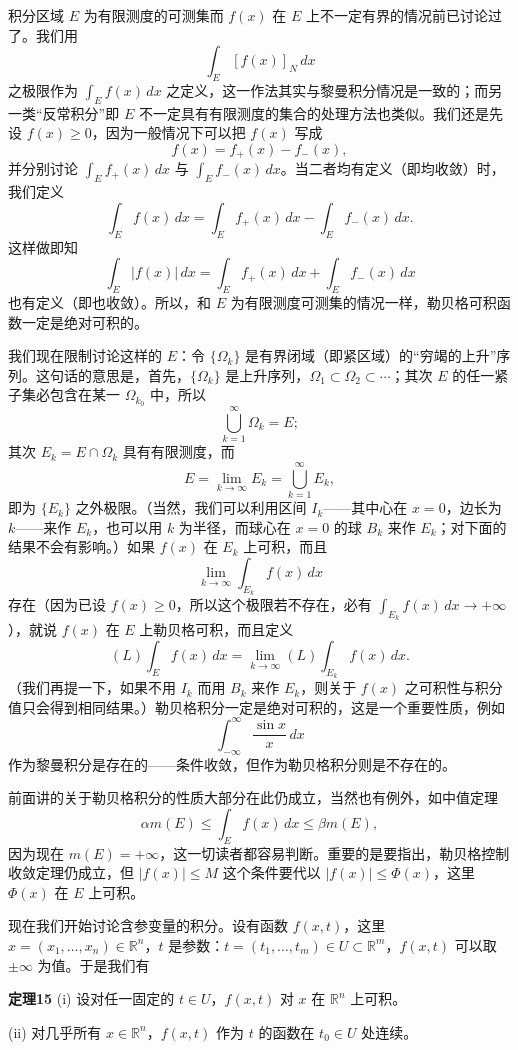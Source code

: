 积分区域 $E$ 为有限测度的可测集而 $f(x)$ 在 $E$ 上不一定有界的情况前已讨论过了。我们用
\[
 \int_E [f(x)]_N\,dx
\]
之极限作为 $\int_E f(x)\,dx$ 之定义，这一作法其实与黎曼积分情况是一致的；而另一类“反常积分”即 $E$ 不一定具有有限测度的集合的处理方法也类似。我们还是先设 $f(x)\ge0$，因为一般情况下可以把 $f(x)$ 写成
\[
 f(x)=f_+(x)-f_-(x),
\]
并分别讨论 $\int_E f_+(x)\,dx$ 与 $\int_E f_-(x)\,dx$。当二者均有定义（即均收敛）时，我们定义
\[
 \int_E f(x)\,dx=\int_E f_+(x)\,dx-\int_E f_-(x)\,dx.
\]
这样做即知
\[
 \int_E |f(x)|\,dx=\int_E f_+(x)\,dx+\int_E f_-(x)\,dx
\]
也有定义（即也收敛）。所以，和 $E$ 为有限测度可测集的情况一样，勒贝格可积函数一定是绝对可积的。

我们现在限制讨论这样的 $E$：令 $\{\Omega_k\}$ 是有界闭域（即紧区域）的“穷竭的上升”序列。这句话的意思是，首先，$\{\Omega_k\}$ 是上升序列，$\Omega_1\subset\Omega_2\subset\cdots$；其次 $E$ 的任一紧子集必包含在某一 $\Omega_{k_0}$ 中，所以
\[
 \bigcup_{k=1}^{\infty}\Omega_k=E;
\]
其次 $E_k=E\cap\Omega_k$ 具有有限测度，而
\[
 E=\lim_{k\to\infty}E_k=\bigcup_{k=1}^{\infty}E_k,
\]
即为 $\{E_k\}$ 之外极限。（当然，我们可以利用区间 $I_k$——其中心在 $x=0$，边长为 $k$——来作 $E_k$，也可以用 $k$ 为半径，而球心在 $x=0$ 的球 $B_k$ 来作 $E_k$；对下面的结果不会有影响。）如果 $f(x)$ 在 $E_k$ 上可积，而且
\[
 \lim_{k\to\infty}\int_{E_k}f(x)\,dx
\]
存在（因为已设 $f(x)\ge0$，所以这个极限若不存在，必有 $\int_{E_k}f(x)\,dx\to+\infty$），就说 $f(x)$ 在 $E$ 上勒贝格可积，而且定义
\[
 (L)\int_E f(x)\,dx=\lim_{k\to\infty}(L)\int_{E_k}f(x)\,dx.
\]
（我们再提一下，如果不用 $I_k$ 而用 $B_k$ 来作 $E_k$，则关于 $f(x)$ 之可积性与积分值只会得到相同结果。）勒贝格积分一定是绝对可积的，这是一个重要性质，例如
\[
 \int_{-\infty}^{\infty}\frac{\sin x}{x}\,dx
\]
作为黎曼积分是存在的——条件收敛，但作为勒贝格积分则是不存在的。

前面讲的关于勒贝格积分的性质大部分在此仍成立，当然也有例外，如中值定理
\[
 \alpha m(E)\le\int_E f(x)\,dx\le\beta m(E),
\]
因为现在 $m(E)=+\infty$，这一切读者都容易判断。重要的是要指出，勒贝格控制收敛定理仍成立，但 $|f(x)|\le M$ 这个条件要代以 $|f(x)|\le\Phi(x)$，这里 $\Phi(x)$ 在 $E$ 上可积。

现在我们开始讨论含参变量的积分。设有函数 $f(x,t)$，这里 $x=(x_1,\ldots,x_n)\in\mathbb R^n$，$t$ 是参数：$t=(t_1,\ldots,t_m)\in U\subset\mathbb R^m$，$f(x,t)$ 可以取 $\pm\infty$ 为值。于是我们有

\noindent\textbf{定理15}\quad
(i) 设对任一固定的 $t\in U$，$f(x,t)$ 对 $x$ 在 $\mathbb R^n$ 上可积。

(ii) 对几乎所有 $x\in\mathbb R^n$，$f(x,t)$ 作为 $t$ 的函数在 $t_0\in U$ 处连续。

